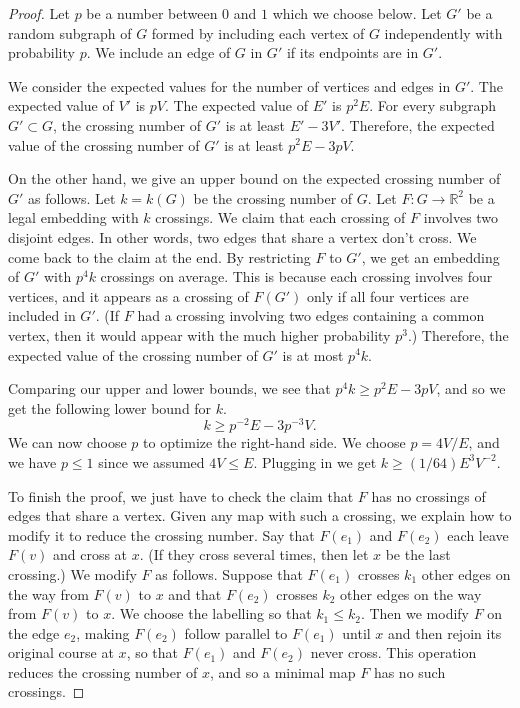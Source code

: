 \begin{proof}
Let $p$ be a number between $0$ and $1$ which we choose below. Let $G'$ be a random subgraph of $G$ formed by including each vertex of $G$ independently with probability $p$. We include an edge of $G$ in $G'$ if its endpoints are in $G'$.

We consider the expected values for the number of vertices and edges in $G'$. The expected value of $V'$ is $pV$. The expected value of $E'$ is $p^2E$. For every subgraph $G'\subset G$, the crossing number of $G'$ is at least $E'-3V'$. Therefore, the expected value of the crossing number of $G'$ is at least $p^2E-3pV$.

On the other hand, we give an upper bound on the expected crossing number of $G'$ as follows. Let $k=k(G)$ be the crossing number of $G$. Let $F:G\to\mathbb R^2$ be a legal embedding with $k$ crossings. We claim that each crossing of $F$ involves two disjoint edges. In other words, two edges that share a vertex don't cross. We come back to the claim at the end. By restricting $F$ to $G'$, we get an embedding of $G'$ with $p^4k$ crossings on average. This is because each crossing involves four vertices, and it appears as a crossing of $F(G')$ only if all four vertices are included in $G'$. (If $F$ had a crossing involving two edges containing a common vertex, then it would appear with the much higher probability $p^3$.) Therefore, the expected value of the crossing number of $G'$ is at most $p^4k$.

Comparing our upper and lower bounds, we see that $p^4k\geq p^2E-3pV$, and so we get the following lower bound for $k$.
\[
k\geq p^{-2}E-3p^{-3}V.
\]
We can now choose $p$ to optimize the right-hand side. We choose $p=4V/E$, and we have $p\leq1$ since we assumed $4V\leq E$. Plugging in we get $k\geq(1/64)E^3V^{-2}$.

To finish the proof, we just have to check the claim that $F$ has no crossings of edges that share a vertex. Given any map with such a crossing, we explain how to modify it to reduce the crossing number. Say that $F(e_1)$ and $F(e_2)$ each leave $F(v)$ and cross at $x$. (If they cross several times, then let $x$ be the last crossing.) We modify $F$ as follows. Suppose that $F(e_1)$ crosses $k_1$ other edges on the way from $F(v)$ to $x$ and that $F(e_2)$ crosses $k_2$ other edges on the way from $F(v)$ to $x$. We choose the labelling so that $k_1\leq k_2$. Then we modify $F$ on the edge $e_2$, making $F(e_2)$ follow parallel to $F(e_1)$ until $x$ and then rejoin its original course at $x$, so that $F(e_1)$ and $F(e_2)$ never cross. This operation reduces the crossing number of $x$, and so a minimal map $F$ has no such crossings.
\end{proof}

